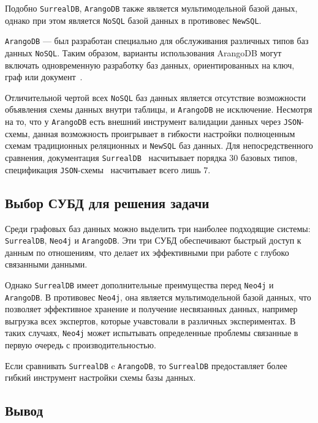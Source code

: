Подобно \texttt{SurrealDB}, \texttt{ArangoDB} также является мультимодельной базой даных, однако при этом является \texttt{NoSQL} базой данных в противовес \texttt{NewSQL}.

\texttt{ArangoDB} ---  был разработан специально для обслуживания различных типов баз данных \texttt{NoSQL}. 
Таким образом, варианты использования ArangoDB могут включать одновременную разработку баз данных, ориентированных на ключ, граф или документ~\cite{arangodb}.

Отличительной чертой всех \texttt{NoSQL} баз данных является отсутствие возможности объявления схемы данных внутри таблицы, и \texttt{ArangoDB} не исключение. 
Несмотря на то, что у \texttt{ArangoDB} есть внешний инструмент валидации данных через \texttt{JSON}-схемы, данная возможность проигрывает в гибкости настройки полноценным схемам традиционных реляционных и \texttt{NewSQL} баз данных.
Для непосредственного сравнения, документация \texttt{SurrealDB}~\cite{surrealdb-doc} насчитывает порядка 30 базовых типов, спецификация \texttt{JSON}-схемы~\cite{json-type} насчитывает всего лишь 7.
\subsection{Выбор СУБД для решения задачи}

Среди графовых баз данных можно выделить три наиболее подходящие системы: \texttt{SurrealDB}, \texttt{Neo4j} и \texttt{ArangoDB}.
Эти три СУБД обеспечивают быстрый доступ к данным по отношениям, что делает их эффективными при работе с глубоко связанными данными.

Однако \texttt{SurrealDB} имеет дополнительные преимущества перед \texttt{Neo4j} и \texttt{ArangoDB}. 
В противовес \texttt{Neo4j}, она является мультимодельной базой данных, что позволяет эффективное хранение и получение несвязанных данных, например выгрузка всех экспертов, которые учавстовали в различных экспериментах.
В таких случаях, \texttt{Neo4j} может испытывать определенные проблемы связанные в первую очередь с производительностью.

Если сравнивать \texttt{SurrealDB} c \texttt{ArangoDB}, то \texttt{SurrealDB} предоставляет более гибкий инструмент настройки схемы базы данных.

\subsection*{Вывод}

